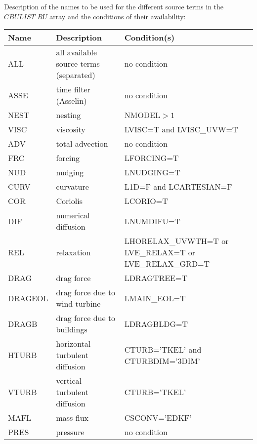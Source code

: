 Description of the names to be used for the different source terms in the $CBULIST\_RU$ array and the conditions of their availability:

\begin{longtable} {|p{}|p{}|p{}|}
\hline
Name & Description & Condition(s) \\
\hline \hline
\endhead
ALL     & all available source terms (separated) & no condition \\\hline \hline
ASSE    & time filter (Asselin)          & no condition                     \\\hline
NEST    & nesting                        & NMODEL$>1$                       \\\hline
VISC    & viscosity                      & LVISC=T and LVISC\_UVW=T         \\\hline
ADV     & total advection                & no condition                     \\\hline
FRC     & forcing                        & LFORCING=T                       \\\hline
NUD     & nudging                        & LNUDGING=T                       \\\hline
CURV    & curvature                      & L1D=F and LCARTESIAN=F           \\\hline
COR     & Coriolis                       & LCORIO=T                         \\\hline
DIF     & numerical diffusion            & LNUMDIFU=T                       \\\hline
REL     & relaxation                     & LHORELAX\_UVWTH=T or LVE\_RELAX=T or LVE\_RELAX\_GRD=T \\\hline
DRAG    & drag force                     & LDRAGTREE=T                      \\\hline
DRAGEOL & drag force due to wind turbine & LMAIN\_EOL=T                     \\\hline
DRAGB   & drag force due to buildings    & LDRAGBLDG=T                      \\\hline
HTURB   & horizontal turbulent diffusion & CTURB='TKEL' and CTURBDIM='3DIM' \\\hline
VTURB   & vertical turbulent diffusion   & CTURB='TKEL'                     \\\hline
MAFL    & mass flux                      & CSCONV='EDKF'                    \\\hline
PRES    & pressure                       & no condition                     \\\hline
\end{longtable}


